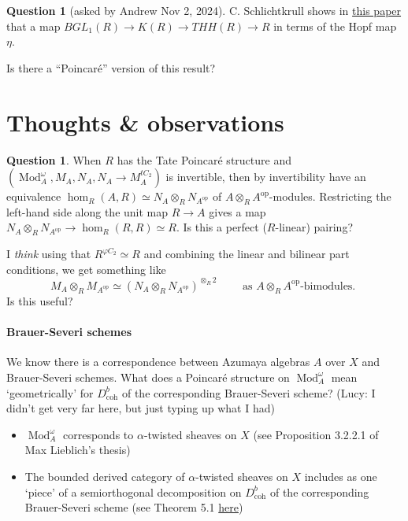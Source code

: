 \documentclass{article}
\DeclareMathOperator{\Mod}{Mod} %
\newcommand{\op}{\mathrm{op}}
\theoremstyle{definition}
\newtheorem{question}[theorem]{Question}
\begin{document}
\begin{question}
    [asked by Andrew Nov 2, 2024] 
    C. Schlichtkrull shows in \href{https://arxiv.org/pdf/math/0405079}{this paper} that a map $ BGL_1(R) \to K(R) \to THH(R) \to R $ in terms of the Hopf map $ \eta $. 

    Is there a ``Poincaré'' version of this result? 
\end{question}

\section{Thoughts \& observations}
\begin{question}
   When $ R $ has the Tate Poincaré structure and $ (\Mod_A^\omega, M_A, N_A, N_A \to M_A^{tC_2}) $ is invertible, then by invertibility have an equivalence $ \hom_R(A, R)\simeq N_A\otimes_R N_{A^\op} $ of $ A \otimes_R A^\op $-modules. 
   Restricting the left-hand side along the unit map $ R \to A $ gives a map $ N_A \otimes_R N_{A^\op} \to \hom_R(R,R) \simeq R $. 
   Is this a perfect ($R$-linear) pairing? 

   I \emph{think} using that $ R^{\varphi C_2} \simeq R $ and combining the linear and bilinear part conditions, we get something like
   \begin{equation*}
       M_A \otimes_R M_{A^\op} \simeq (N_A \otimes_R N_{A^\op})^{\otimes_R 2} \qquad \text{ as $A \otimes_R A^\op$-bimodules. }
   \end{equation*}
   Is this useful?
\end{question}

\paragraph{Brauer-Severi schemes} 
We know there is a correspondence between Azumaya algebras $ A $ over $ X $ and Brauer-Severi schemes. 
What does a Poincaré structure on $ \Mod_A^\omega $ mean `geometrically' for $ D^b_{\mathrm{coh}} $ of the corresponding Brauer-Severi scheme? 
(Lucy: I didn't get very far here, but just typing up what I had)
\begin{itemize}
    \item $ \Mod_A^\omega $ corresponds to $ \alpha $-twisted sheaves on $ X $ (see Proposition 3.2.2.1 of Max Lieblich's thesis)
    \item The bounded derived category of $ \alpha $-twisted sheaves on $ X $ includes as one `piece' of a semiorthogonal decomposition on $ D^b_{\mathrm{coh}} $ of the corresponding Brauer-Severi scheme (see Theorem 5.1 \href{https://arxiv.org/abs/math/0511497}{here})
\end{itemize}
\end{document}
